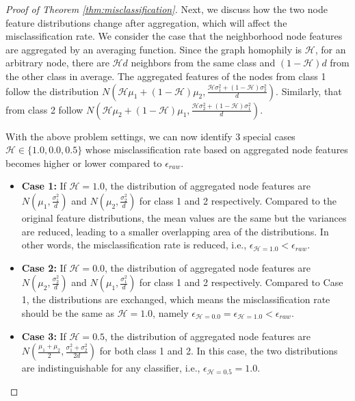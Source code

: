 \documentclass{article}
\theoremstyle{plain}
\begin{document}
\begin{proof}[Proof of Theorem \ref{thm:misclassification}]
Next, we discuss how the two node feature distributions change after aggregation, which will affect the misclassification rate. 
We consider the case that the neighborhood node features are aggregated by an averaging function.
Since the graph homophily is $\mathcal{H}$, for an arbitrary node, there are $\mathcal{H}d$ neighbors from the same class and $(1-\mathcal{H})d$ from the other class in average.  
The aggregated features of the nodes from class 1 follow the distribution $N(\mathcal{H}\mu_1 + (1-\mathcal{H})\mu_2, \frac{\mathcal{H}\sigma_1^2 + (1-\mathcal{H})\sigma_2^2}{d})$. Similarly, that from class 2 follow $N(\mathcal{H}\mu_2 + (1-\mathcal{H})\mu_1, \frac{\mathcal{H}\sigma_2^2 + (1-\mathcal{H})\sigma_1^2}{d})$.

With the above problem settings, we can now identify 3 special cases $\mathcal{H} \in \{1.0,0.0,0.5\}$ whose misclassification rate based on aggregated node features becomes higher or lower compared to $\epsilon_{raw}$.
\begin{itemize}
    \item \textbf{Case 1:} If $\mathcal{H} = 1.0$, the distribution of aggregated node features are $N(\mu_1, \frac{\sigma_1^2}{d})$ and $N(\mu_2, \frac{\sigma_2^2}{d})$ for class 1 and 2 respectively. Compared to the original feature distributions, the mean values are the same but the variances are reduced, leading to a smaller overlapping area of the distributions. In other words, the misclassification rate is reduced, i.e., $\epsilon_{\mathcal{H} = 1.0}<\epsilon_{raw}$.

    \item \textbf{Case 2:} If $\mathcal{H} = 0.0$, the distribution of aggregated node features are $N(\mu_2, \frac{\sigma_2^2}{d})$ and $N(\mu_1, \frac{\sigma_1^2}{d})$ for class 1 and 2 respectively. Compared to Case 1, the distributions are exchanged, which means the misclassification rate should be the same as $\mathcal{H}=1.0$, namely $\epsilon_{\mathcal{H} = 0.0}=\epsilon_{\mathcal{H} = 1.0}<\epsilon_{raw}$.

    \item \textbf{Case 3:} If $\mathcal{H} = 0.5$, the distribution of aggregated node features are $N(\frac{\mu_1+\mu_2}{2}, \frac{\sigma_1^2+\sigma_2^2}{2d})$ for both class 1 and 2. In this case, the two distributions are indistinguishable for any classifier, i.e., $\epsilon_{\mathcal{H} = 0.5}=1.0$. 
\end{itemize}


\end{proof}
\end{document}
